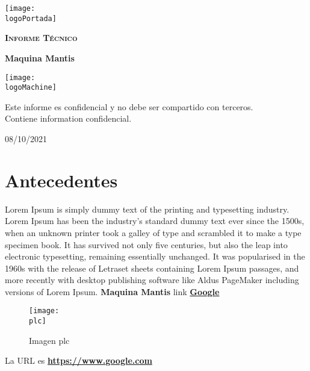 \documentclass[a4paper]{article}
\newcommand{\logoPortada}{images/logo.png}
\newcommand{\logoMachine}{images/mantis3.png}
\newcommand{\machineName}{Maquina Mantis}
\newcommand{\startDate}{08/10/2021}
\newcommand{\plc}{images/plc.png}
\begin{document}
  \cfoot{\thepage}
\begin{titlepage}
  \centering
  \texttt{[image: \\logoPortada]}\par{}\vspace{1cm}
  {\scshape\LARGE \textbf{Informe Técnico}\par{}}
  \vspace{0.2cm}
  \vfill{}
  {\Huge\bfseries\textcolor{greenPortada}{\machineName}\par{}}
  \vfill{}\vfill{}
  \texttt{[image: \\logoMachine]}\par{}\vspace{1cm}
  \vfill{}
  \begin{tcolorbox}[colback=red!5!white,colframe=red!75!black]
    \centering{}
    Este informe es confidencial y no debe ser compartido con terceros.\\ Contiene information confidencial.
  \end{tcolorbox}
  \vfill{}
  {\large\startDate}
\end{titlepage}
\clearpage{}
\tableofcontents{}
\clearpage{}
\section{Antecedentes}
Lorem Ipsum is simply dummy text of the printing and typesetting industry. Lorem Ipsum has been the industry's standard dummy text ever since the 1500s, when an unknown printer took a galley of type and scrambled it to make a type specimen book. It has survived not only five centuries, but also the leap into electronic typesetting, remaining essentially unchanged. It was popularised in the 1960s with the release of Letraset sheets containing Lorem Ipsum passages, and more recently with desktop publishing software like Aldus PageMaker including versions of Lorem Ipsum. \textbf{\machineName} link \href{https://www.google.com}{\textbf{\color{blue}Google}}
\vspace{0.2cm}
\begin{figure}[h]
  \centering{}
  \texttt{[image: \\plc]}
  \caption{Imagen plc}
\end{figure}
\vspace{0.2cm}
\begin{tcolorbox}[enhanced,attach boxed title to top center={yshift=-3mm,yshifttext=-1mm},
  colback=blue!5!white,colframe=blue!75!black,colbacktitle=greenPortada!80!black,
  title=Dirección URL,fonttitle=\bfseries,
  boxed title style={size=small,colframe=red!50!black} ]
  \centering{}
  La URL es \href{https://www.google.com}\textbf{\color{blue}https://www.google.com}
\end{tcolorbox}
\vspace{0.2cm}
\end{document}
